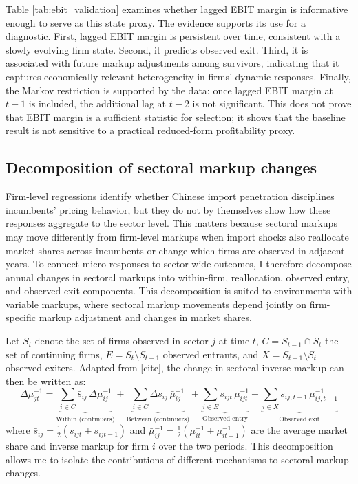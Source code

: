 \documentclass[12pt]{article}
\newcommand{\textcite}[2][]{[cite]}
\begin{document}
Table \ref{tab:ebit_validation} examines whether lagged EBIT margin is informative enough to serve as this state proxy. The evidence supports its use for a diagnostic. First, lagged EBIT margin is persistent over time, consistent with a slowly evolving firm state. Second, it predicts observed exit. Third, it is associated with future markup adjustments among survivors, indicating that it captures economically relevant heterogeneity in firms' dynamic responses. Finally, the Markov restriction is supported by the data: once lagged EBIT margin at $t-1$ is included, the additional lag at $t-2$ is not significant. This does not prove that EBIT margin is a sufficient statistic for selection; it shows that the baseline result is not sensitive to a practical reduced-form profitability proxy. 

\subsection{Decomposition of sectoral markup changes}
\label{sec:decomposition}

Firm-level regressions identify whether Chinese import penetration disciplines incumbents' pricing behavior, but they do not by themselves show how these responses aggregate to the sector level. This matters because sectoral markups may move differently from firm-level markups when import shocks also reallocate market shares across incumbents or change which firms are observed in adjacent years. To connect micro responses to sector-wide outcomes, I therefore decompose annual changes in sectoral markups into within-firm, reallocation, observed entry, and observed exit components. This decomposition is suited to environments with variable markups, where sectoral markup movements depend jointly on firm-specific markup adjustment and changes in market shares. 

Let $S_t$ denote the set of firms observed in sector $j$ at time $t$, $C = S_{t-1} \cap S_t$ the set of continuing firms, $E = S_t \setminus S_{t-1}$ observed entrants, and $X = S_{t-1} \setminus S_t$ observed exiters. Adapted from \textcite{melitzDynamicOlleyPakesProductivity2015}, the change in sectoral inverse markup can then be written as:
\[\Delta \mu_{jt}^{-1}
=
\underbrace{\sum_{i \in C} \bar{s}_{ij}\,\Delta \mu_{ij}^{-1}}_{\text{Within (continuers)}}
+
\underbrace{\sum_{i \in C} \Delta s_{ij}\,\bar{\mu}_{ij}^{-1}}_{\text{Between (continuers)}}
+
\underbrace{\sum_{i \in E} s_{ijt}\,\mu_{ijt}^{-1}}_{\text{Observed entry}} - \underbrace{\sum_{i \in X} s_{ij,t-1}\,\mu_{ij,t-1}^{-1}}_{\text{Observed exit}}\]
where $\bar{s}_{ij} = \frac{1}{2}(s_{ijt} + s_{ijt-1})$ and $\bar{\mu}_{ij}^{-1} = \frac{1}{2}(\mu_{it}^{-1} + \mu_{it-1}^{-1})$ are the average market share and inverse markup for firm $i$ over the two periods. This decomposition allows me to isolate the contributions of different mechanisms to sectoral markup changes.
\end{document}
